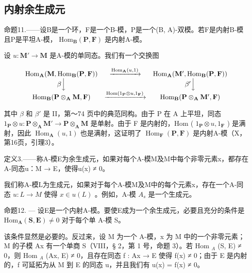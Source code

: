 \subsection{内射余生成元}

命题11.——设B是一个环，F是一个B-模，P是一个(B, A)-双模。若F是内射B-模且P是平坦A-模， \(\mathrm{Hom}_{\mathbf{B}}(\mathbf{P},\mathbf{F})\) 是内射A-模。

设 \(u: \mathbf{M}' \to \mathbf{M}\) 是A-模的单同态。我们有一个交换图

\[
\begin{array}{c c c} \operatorname{Hom} _ {\mathbf {A}} (\mathbf {M}, \operatorname{Hom} _ {\mathbf {B}} (\mathbf {P}, \mathbf {F})) & \xrightarrow {\operatorname{Hom} _ {\mathbf {A}} (u , 1)} & \operatorname{Hom} _ {\mathbf {A}} (\mathbf {M} ^ {\prime}, \operatorname{Hom} _ {\mathbf {B}} (\mathbf {P}, \mathbf {F})) \\ \beta \Big \downarrow & & \beta^ {\prime} \Big \downarrow \\ \operatorname{Hom} _ {\mathbf {B}} (\mathbf {P} \otimes_ {\mathbf {A}} \mathbf {M}, \mathbf {F}) & \xrightarrow {\operatorname{Hom} (1 _ {\mathbf {P}} \otimes u , 1 _ {\mathbf {F}})} & \operatorname{Hom} _ {\mathbf {B}} (\mathbf {P} \otimes_ {\mathbf {A}} \mathbf {M} ^ {\prime}, \mathbf {F}) \end{array}
\]

其中 \(\beta\) 和 \(\beta'\) 是 II，第～74 页中的典范同构。由于 P 在 A 上平坦，同态 \(1_{\mathbf{P}} \otimes u: \mathbf{P} \otimes_{\mathbf{A}} \mathbf{M}' \to \mathbf{P} \otimes_{\mathbf{A}} \mathbf{M}\) 是单射。由于 F 是内射的，Hom ( \(1_{\mathbf{P}} \otimes u, 1_{\mathbf{F}}\) ) 是满射，因此 \(\operatorname{Hom}_{\mathbf{A}}(u, 1)\) 也是满射，这证明了 \(\operatorname{Hom}_{\mathbf{F}}(\mathbf{P}, \mathbf{F})\) 是内射A-模（X，第16页，引理3）。

定义3.——称A-模E为余生成元，如果对每个A-模M及M中每个非零元素x，都存在A-同态u：M → E，使得u(x) ≠ 0。

我们称A-模L为生成元，如果对于每个A-模M及M中的每个元素x，存在一个A-同态 \(u : L \to M\) 使得 \(x \in u(L)\) 。例如，A-模 \(A_{s}\) 是一个生成元。

命题12. --- 设E是一个内射A-模。要使E成为一个余生成元，必要且充分的条件是 \(\mathrm{Hom}_{\mathbf{A}}(\mathbf{S},\mathbf{E})\neq 0\) 对于每个单 A-模 S。

该条件显然是必要的。反过来，设 M 为一个 A-模，x 为 M 中的一个非零元素；M 的子模 Ax 有一个单商 S（VIII，§ 2，第 1 号，命题 3）。若 Hom \(_{A}\) (S, E) ≠ 0，则 Hom \(_{A}\) (Ax, E) ≠ 0，且存在同态 f : Ax → E 使得 f(x) ≠ 0；由于 E 是内射的，f 可延拓为从 M 到 E 的同态 u，并且我们有 u(x) = f(x) ≠ 0。


